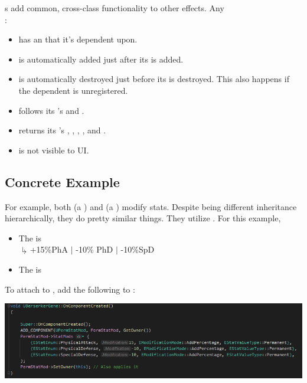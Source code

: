 



s add common, cross-class functionality to other effects. Any \\:

\begin{itemize}
	\item{has an  that it's dependent upon.}
	\item{is automatically added just after its  is added.}
	\item{is automatically destroyed just before its  is destroyed. This also happens if the dependent is unregistered.}
	\item{follows its 's  and .}
	\item{returns its 's , , , , and .}
	\item{is not visible to UI.}
\end{itemize}

\subsection{Concrete Example}

For example, both  (a ) and  (a ) modify stats. Despite being different inheritance hierarchically, they do pretty similar things. They utilize . For this example, 
\begin{itemize}
	\item{The  is \\
		\hspace*{2em}$\drsh{}$+15\%PhA $|$ -10\% PhD $|$ -10\%SpD}
	\item{The  is }
\end{itemize}
To attach  to , add the following to :

\begin{center}
	\includegraphics[scale=\ScreenshotScale]{../Effects-Documentation/dependent-add}
\end{center}

